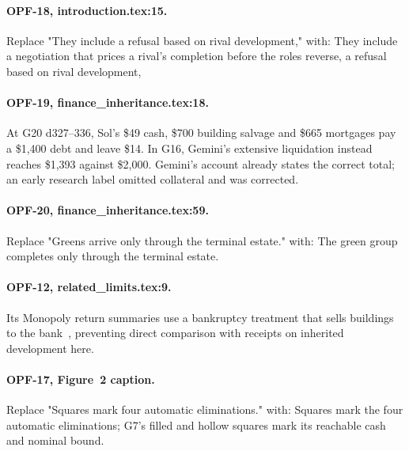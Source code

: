 \paragraph{OPF-18, introduction.tex:15.} Replace "They include a refusal based on rival development," with:
They include a negotiation that prices a rival's completion before the roles reverse, a refusal based on rival development,

\paragraph{OPF-19, finance\_inheritance.tex:18.}
At G20 d327--336, Sol's \$49 cash, \$700 building salvage and \$665 mortgages pay a \$1,400 debt and leave \$14. In G16, Gemini's extensive liquidation instead reaches \$1,393 against \$2,000. Gemini's account already states the correct total; an early research label omitted collateral and was corrected.

\paragraph{OPF-20, finance\_inheritance.tex:59.} Replace "Greens arrive only through the terminal estate." with:
The green group completes only through the terminal estate.

\paragraph{OPF-12, related\_limits.tex:9.}
Its Monopoly return summaries use a bankruptcy treatment that sells buildings to the bank~\cite[App.~C.3]{hu2026finboardbench}, preventing direct comparison with receipts on inherited development here.

\paragraph{OPF-17, Figure~2 caption.} Replace "Squares mark four automatic eliminations." with:
Squares mark the four automatic eliminations; G7's filled and hollow squares mark its reachable cash and nominal bound.

